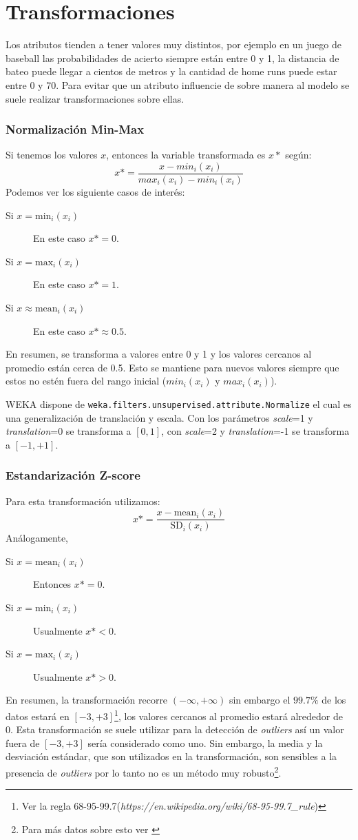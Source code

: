 \documentclass[10pt,a4paper]{article}
\begin{document}
\part{Transformaciones}
Los atributos tienden a tener valores muy distintos, por ejemplo en un juego de baseball las probabilidades de acierto siempre están entre 0 y 1, la distancia de bateo puede llegar a cientos de metros y la cantidad de home runs puede estar entre 0 y 70. Para evitar que un atributo influencie de sobre manera al modelo se suele realizar transformaciones sobre ellas.

\section{Normalización Min-Max}
Si tenemos los valores $x$, entonces la variable transformada es $x*$ según:
\[
x* = \frac{x - min_i(x_i)}{max_i(x_i) - min_i(x_i)}
\]
Podemos ver los siguiente casos de interés:
\begin{description}
\item[Si $x=\text{min}_i(x_i)$] En este caso $x* = 0$.
\item[Si $x=\text{max}_i(x_i)$] En este caso $x* = 1$.
\item[Si $x \approx \text{mean}_i(x_i)$] En este caso $x* \approx 0.5$.
\end{description}
En resumen, se transforma a valores entre 0 y 1 y los valores cercanos al promedio están cerca de 0.5. Esto se mantiene para nuevos valores siempre que estos no estén fuera del rango inicial ($min_i(x_i)$ y $max_i(x_i)$).

WEKA dispone de \lstinline{weka.filters.unsupervised.attribute.Normalize} el cual es una generalización de translación y escala. Con los parámetros \textit{scale}=1 y \textit{translation}=0 se transforma a $[0, 1]$, con \textit{scale}=2 y \textit{translation}=-1 se transforma a $[-1, +1]$.

\section{Estandarización Z-score}
Para esta transformación utilizamos:
\[
x* = \frac{ x - \text{mean}_i(x_i) }{\text{SD}_i(x_i)}
\]
Análogamente,
\begin{description}
\item[Si $x=\text{mean}_i(x_i)$] Entonces $x* = 0$.
\item[Si $x=\text{min}_i(x_i)$] Usualmente $x* < 0$.
\item[Si $x=\text{max}_i(x_i)$] Usualmente $x* > 0$.
\end{description}
En resumen, la transformación recorre $(-\infty, +\infty)$ sin embargo el $99.7\%$ de los datos estará en $[-3, +3]$\footnote{Ver la regla 68-95-99.7(\textit{https://en.wikipedia.org/wiki/68-95-99.7\_rule})}, los valores cercanos al promedio estará alrededor de 0.
Esta transformación se suele utilizar para la detección de \textit{outliers} así un valor fuera de $[-3, +3]$ sería considerado como uno. Sin embargo, la media y la desviación estándar, que son utilizados en la transformación, son sensibles a la presencia de \textit{outliers} por lo tanto no es un método muy robusto\footnote{Para más datos sobre esto ver \cite{hodge2004survey}}.
\end{document}
